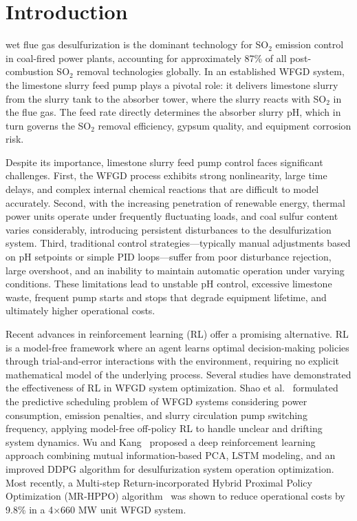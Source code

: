 \documentclass[journal]{IEEEtran}
\begin{document}

\section{Introduction}
 wet flue gas desulfurization is the dominant technology for SO$_2$ emission control in coal-fired power plants, accounting for approximately 87\% of all post-combustion SO$_2$ removal technologies globally. In an established WFGD system, the limestone slurry feed pump plays a pivotal role: it delivers limestone slurry from the slurry tank to the absorber tower, where the slurry reacts with SO$_2$ in the flue gas. The feed rate directly determines the absorber slurry pH, which in turn governs the SO$_2$ removal efficiency, gypsum quality, and equipment corrosion risk.

Despite its importance, limestone slurry feed pump control faces significant challenges. First, the WFGD process exhibits strong nonlinearity, large time delays, and complex internal chemical reactions that are difficult to model accurately. Second, with the increasing penetration of renewable energy, thermal power units operate under frequently fluctuating loads, and coal sulfur content varies considerably, introducing persistent disturbances to the desulfurization system. Third, traditional control strategies—typically manual adjustments based on pH setpoints or simple PID loops—suffer from poor disturbance rejection, large overshoot, and an inability to maintain automatic operation under varying conditions. These limitations lead to unstable pH control, excessive limestone waste, frequent pump starts and stops that degrade equipment lifetime, and ultimately higher operational costs.

Recent advances in reinforcement learning (RL) offer a promising alternative. RL is a model-free framework where an agent learns optimal decision-making policies through trial-and-error interactions with the environment, requiring no explicit mathematical model of the underlying process. Several studies have demonstrated the effectiveness of RL in WFGD system optimization. Shao et al.~\cite{shao2020} formulated the predictive scheduling problem of WFGD systems considering power consumption, emission penalties, and slurry circulation pump switching frequency, applying model-free off-policy RL to handle unclear and drifting system dynamics. Wu and Kang~\cite{wu2022} proposed a deep reinforcement learning approach combining mutual information-based PCA, LSTM modeling, and an improved DDPG algorithm for desulfurization system operation optimization. Most recently, a Multi-step Return-incorporated Hybrid Proximal Policy Optimization (MR-HPPO) algorithm~\cite{mr2026} was shown to reduce operational costs by 9.8\% in a 4×660 MW unit WFGD system.
\end{document}
